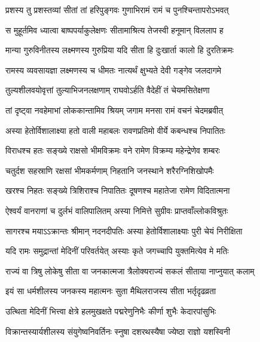 
\twolineshloka
{प्रशस्य तु प्रशस्तव्यां सीतां तां हरिपुङ्गवः}
{गुणाभिरामं रामं च पुनश्चिन्तापरोऽभवत्} %

\twolineshloka
{स मुहूर्तमिव ध्यात्वा बाष्पपर्याकुलेक्षणः}
{सीतामाश्रित्य तेजस्वी हनूमान् विललाप ह} %

\twolineshloka
{मान्या गुरुविनीतस्य लक्ष्मणस्य गुरुप्रिया}
{यदि सीता हि दुःखार्ता कालो हि दुरतिक्रमः} %

\twolineshloka
{रामस्य व्यवसायज्ञा लक्ष्मणस्य च धीमतः}
{नात्यर्थं क्षुभ्यते देवी गङ्गेव जलदागमे} %

\twolineshloka
{तुल्यशीलवयोवृत्तां तुल्याभिजनलक्षणाम्}
{राघवोऽर्हति वैदेहीं तं चेयमसितेक्षणा} %

\twolineshloka
{तां दृष्ट्वा नवहेमाभां लोककान्तामिव श्रियम्}
{जगाम मनसा रामं वचनं चेदमब्रवीत्} %

\twolineshloka
{अस्या हेतोर्विशालाक्ष्या हतो वाली महाबलः}
{रावणप्रतिमो वीर्ये कबन्धश्च निपातितः} %

\twolineshloka
{विराधश्च हतः सङ्ख्ये राक्षसो भीमविक्रमः}
{वने रामेण विक्रम्य महेन्द्रेणेव शम्बरः} %

\twolineshloka
{चतुर्दश सहस्राणि रक्षसां भीमकर्मणाम्}
{निहतानि जनस्थाने शरैरग्निशिखोपमैः} %

\twolineshloka
{खरश्च निहतः सङ्ख्ये त्रिशिराश्च निपातितः}
{दूषणश्च महातेजा रामेण विदितात्मना} %

\twolineshloka
{ऐश्वर्यं वानराणां च दुर्लभं वालिपालितम्}
{अस्या निमित्ते सुग्रीवः प्राप्तवाँल्लोकविश्रुतः} %

\twolineshloka
{सागरश्च मयाऽऽक्रान्तः श्रीमान् नदनदीपतिः}
{अस्या हेतोर्विशालाक्ष्याः पुरी चेयं निरीक्षिता} %

\twolineshloka
{यदि रामः समुद्रान्तां मेदिनीं परिवर्तयेत्}
{अस्याः कृते जगच्चापि युक्तमित्येव मे मतिः} %

\twolineshloka
{राज्यं वा त्रिषु लोकेषु सीता वा जनकात्मजा}
{त्रैलोक्यराज्यं सकलं सीताया नाप्नुयात् कलाम्} %

\twolineshloka
{इयं सा धर्मशीलस्य जनकस्य महात्मनः}
{सुता मैथिलराजस्य सीता भर्तृदृढव्रता} %

\twolineshloka
{उत्थिता मेदिनीं भित्त्वा क्षेत्रे हलमुखक्षते}
{पद्मरेणुनिभैः कीर्णा शुभैः केदारपांसुभिः} %

\twolineshloka
{विक्रान्तस्यार्यशीलस्य संयुगेष्वनिवर्तिनः}
{स्नुषा दशरथस्यैषा ज्येष्ठा राज्ञो यशस्विनी} %

